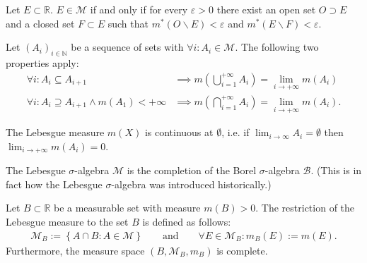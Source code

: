     \begin{property}
        Let $E\subset\mathbb{R}$. $E\in\mathcal{M}$ if and only if for every $\varepsilon>0$ there exist an open set $O\supset E$ and a closed set $F\subset E$ such that $m^*(O\backslash E) < \varepsilon$ and $m^*(E\backslash F)<\varepsilon$.
    \end{property}

    \begin{property}
        Let $(A_i)_{i\in\mathbb{N}}$ be a sequence of sets with $\forall i:A_i\in\mathcal{M}$. The following two properties apply:
        \begin{align}
            \forall i: A_i\subseteq A_{i+1} &\implies m\left(\bigcup_{i=1}^{+\infty}A_i\right) = \lim_{i\rightarrow+\infty}m(A_i)\\
            \forall i: A_i\supseteq A_{i+1} \land m(A_1)<+\infty &\implies m\left(\bigcap_{i=1}^{+\infty}A_i\right) = \lim_{i\rightarrow+\infty}m(A_i).
        \end{align}
    \end{property}
    \begin{property}[Continuity]
        The Lebesgue measure $m(X)$ is continuous at $\emptyset$, i.e. if $\lim_{i\rightarrow\infty}A_i=\emptyset$ then $\lim_{i\rightarrow+\infty}m(A_i) = 0$.
    \end{property}

    \begin{property}\label{lebesgue:completion_remark}
        The Lebesgue $\sigma$-algebra $\mathcal{M}$ is the completion of the Borel $\sigma$-algebra $\mathcal{B}$. (This is in fact how the Lebesgue $\sigma$-algebra was introduced historically.)
    \end{property}

    \begin{construct}[Restriction]\label{lebesgue:restricted_lebesgue_measure}
        Let $B\subset\mathbb{R}$ be a measurable set with measure $m(B)>0$. The restriction of the Lebesgue measure to the set $B$ is defined as follows:
        \begin{gather}
            \mathcal{M}_B := \left\{A\cap B:A\in\mathcal{M}\right\}\qquad\text{and}\qquad\forall E\in\mathcal{M}_B:m_B(E) := m(E).
        \end{gather}
        Furthermore, the measure space $(B,\mathcal{M}_B,m_B)$ is complete.
    \end{construct}

